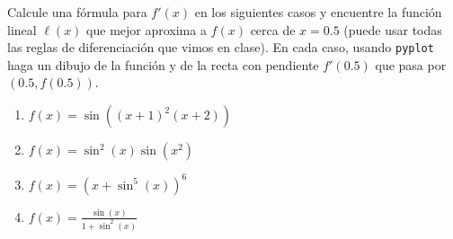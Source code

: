 \documentclass[12pt, a4paper]{article}
\begin{document}


\item Calcule una fórmula para $f'(x)$ en los siguientes casos y encuentre la función lineal $\ell(x)$ que mejor aproxima a $f(x)$ cerca de $x=0.5$ (puede usar todas las reglas de diferenciación que vimos en clase). En cada caso, usando \verb!pyplot! haga un dibujo de la funci\'on y de la recta con pendiente $f'(0.5)$ que pasa por $(0.5,f(0.5))$.
\begin{enumerate}
\item $f(x)=\sin((x+1)^2(x+2))$
\item $f(x)=\sin^2(x)\sin(x^2)$
\item $f(x)=(x+\sin^5(x))^6$
\item $f(x)=\frac{\sin(x)}{1+\sin^2(x)}$
\end{enumerate}
\end{document}
